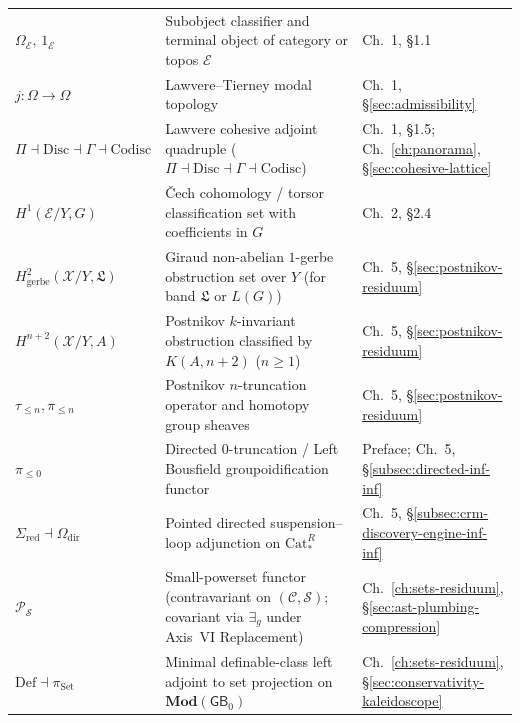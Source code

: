 \documentclass[10pt,twoside,openright]{book}
\theoremstyle{crmplain}
\theoremstyle{crmdef}
\theoremstyle{crmremark}
\newcommand{\CohesiveQuad}{\Pi \dashv \mathrm{Disc} \dashv \Gamma \dashv \mathrm{Codisc}}
\begin{document}
{\begin{xltabular}{\textwidth}{@{}>{\bfseries}P{0.24\textwidth}YP{0.21\textwidth}@{}}
$\Omega_{\mathcal{E}},\, 1_{\mathcal{E}}$ & Subobject classifier and terminal object of category or topos $\mathcal{E}$ & Ch.~1, \S1.1 \\
$j : \Omega \to \Omega$ & Lawvere--Tierney modal topology & Ch.~1, \S\ref{sec:admissibility} \\
$\CohesiveQuad$ & Lawvere cohesive adjoint quadruple ($\Pi \dashv \mathrm{Disc} \dashv \Gamma \dashv \mathrm{Codisc}$) & Ch.~1, \S1.5; Ch.~\ref{ch:panorama}, \S\ref{sec:cohesive-lattice} \\
$H^1(\mathcal{E}/Y, G)$ & \v{C}ech cohomology / torsor classification set with coefficients in $G$ & Ch.~2, \S2.4 \\
$H^2_{\mathrm{gerbe}}(\mathcal{X}/Y, \mathfrak{L})$ & Giraud non-abelian $1$-gerbe obstruction set over $Y$ (for band $\mathfrak{L}$ or $L(G)$) & Ch.~5, \S\ref{sec:postnikov-residuum} \\
$H^{n+2}(\mathcal{X}/Y, A)$ & Postnikov $k$-invariant obstruction classified by $K(A, n+2)$ ($n \ge 1$) & Ch.~5, \S\ref{sec:postnikov-residuum} \\
$\tau_{\le n}, \pi_{\le n}$ & Postnikov $n$-truncation operator and homotopy group sheaves & Ch.~5, \S\ref{sec:postnikov-residuum} \\
$\pi_{\le 0}$ & Directed $0$-truncation / Left Bousfield groupoidification functor & Preface; Ch.~5, \S\ref{subsec:directed-inf-inf} \\
$\Sigma_{\mathrm{red}} \dashv \Omega_{\mathrm{dir}}$ & Pointed directed suspension--loop adjunction on $\mathrm{Cat}^R_*$ & Ch.~5, \S\ref{subsec:crm-discovery-engine-inf-inf} \\
$\mathcal{P}_{\mathcal{S}}$ & Small-powerset functor (contravariant on $(\mathcal{C}, \mathcal{S})$; covariant via $\exists_g$ under Axis~VI Replacement) & Ch.~\ref{ch:sets-residuum}, \S\ref{sec:ast-plumbing-compression} \\
$\mathrm{Def} \dashv \pi_{\mathrm{Set}}$ & Minimal definable-class left adjoint to set projection on $\mathbf{Mod}(\mathsf{GB}_0)$ & Ch.~\ref{ch:sets-residuum}, \S\ref{sec:conservativity-kaleidoscope} \\
\end{xltabular}\par}

\vspace{1.0em}
\end{document}
